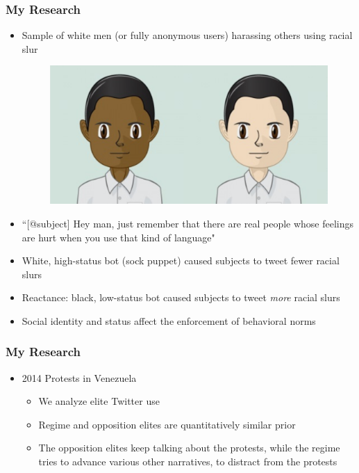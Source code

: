 \documentclass{beamer}
\begin{document}
\begin{frame}
	\frametitle{My Research}
	\begin{itemize}
		
		\item Sample of white men (or fully anonymous users) harassing others using racial slur
		\pause 
		\begin{figure}
			
			
			\includegraphics[scale=.10]{figures/white_black_bot_comparison.png}
		\end{figure}
		\pause
		\item ``[@subject] Hey man, just remember that there are real people whose feelings are hurt when you use that kind of language"
		\pause
		\item White, high-status bot (sock puppet) caused subjects to tweet fewer racial slurs
		\pause
		\item Reactance: black, low-status bot caused subjects to tweet \textit{more} racial slurs
		\pause
		\item Social identity and status affect the enforcement of behavioral norms
		
		
	\end{itemize}
\end{frame}	
	



\begin{frame}
	\frametitle{My Research}
	\begin{itemize}
		
		
		

			\item 2014 Protests in Venezuela 


			\begin{itemize}
				\item We analyze elite Twitter use \pause
				\item Regime and opposition elites are quantitatively similar prior  \pause

				\item The opposition elites keep talking about the protests, while the regime tries to advance various other narratives, to distract from the protests \pause

				
			\end{itemize}


		
	\end{itemize}
\end{frame}	
\end{document}
